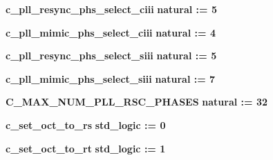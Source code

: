 \begin{DoxyCompactItemize}
\item 
{\bf c\+\_\+pll\+\_\+resync\+\_\+phs\+\_\+select\+\_\+ciii} {\bfseries \textcolor{comment}{natural}\textcolor{vhdlchar}{ }\textcolor{vhdlchar}{ }\textcolor{vhdlchar}{\+:}\textcolor{vhdlchar}{=}\textcolor{vhdlchar}{ }\textcolor{vhdlchar}{ } \textcolor{vhdldigit}{5} \textcolor{vhdlchar}{ }} 
\item 
{\bf c\+\_\+pll\+\_\+mimic\+\_\+phs\+\_\+select\+\_\+ciii} {\bfseries \textcolor{comment}{natural}\textcolor{vhdlchar}{ }\textcolor{vhdlchar}{ }\textcolor{vhdlchar}{\+:}\textcolor{vhdlchar}{=}\textcolor{vhdlchar}{ }\textcolor{vhdlchar}{ } \textcolor{vhdldigit}{4} \textcolor{vhdlchar}{ }} 
\item 
{\bf c\+\_\+pll\+\_\+resync\+\_\+phs\+\_\+select\+\_\+siii} {\bfseries \textcolor{comment}{natural}\textcolor{vhdlchar}{ }\textcolor{vhdlchar}{ }\textcolor{vhdlchar}{\+:}\textcolor{vhdlchar}{=}\textcolor{vhdlchar}{ }\textcolor{vhdlchar}{ } \textcolor{vhdldigit}{5} \textcolor{vhdlchar}{ }} 
\item 
{\bf c\+\_\+pll\+\_\+mimic\+\_\+phs\+\_\+select\+\_\+siii} {\bfseries \textcolor{comment}{natural}\textcolor{vhdlchar}{ }\textcolor{vhdlchar}{ }\textcolor{vhdlchar}{\+:}\textcolor{vhdlchar}{=}\textcolor{vhdlchar}{ }\textcolor{vhdlchar}{ } \textcolor{vhdldigit}{7} \textcolor{vhdlchar}{ }} 
\item 
{\bf C\+\_\+\+M\+A\+X\+\_\+\+N\+U\+M\+\_\+\+P\+L\+L\+\_\+\+R\+S\+C\+\_\+\+P\+H\+A\+S\+ES} {\bfseries \textcolor{comment}{natural}\textcolor{vhdlchar}{ }\textcolor{vhdlchar}{ }\textcolor{vhdlchar}{\+:}\textcolor{vhdlchar}{=}\textcolor{vhdlchar}{ }\textcolor{vhdlchar}{ } \textcolor{vhdldigit}{32} \textcolor{vhdlchar}{ }} 
\item 
{\bf c\+\_\+set\+\_\+oct\+\_\+to\+\_\+rs} {\bfseries \textcolor{comment}{std\+\_\+logic}\textcolor{vhdlchar}{ }\textcolor{vhdlchar}{ }\textcolor{vhdlchar}{\+:}\textcolor{vhdlchar}{=}\textcolor{vhdlchar}{ }\textcolor{vhdlchar}{ }\textcolor{vhdlchar}{\textquotesingle{}}\textcolor{vhdlchar}{ } \textcolor{vhdldigit}{0} \textcolor{vhdlchar}{ }\textcolor{vhdlchar}{\textquotesingle{}}\textcolor{vhdlchar}{ }} 
\item 
{\bf c\+\_\+set\+\_\+oct\+\_\+to\+\_\+rt} {\bfseries \textcolor{comment}{std\+\_\+logic}\textcolor{vhdlchar}{ }\textcolor{vhdlchar}{ }\textcolor{vhdlchar}{\+:}\textcolor{vhdlchar}{=}\textcolor{vhdlchar}{ }\textcolor{vhdlchar}{ }\textcolor{vhdlchar}{\textquotesingle{}}\textcolor{vhdlchar}{ } \textcolor{vhdldigit}{1} \textcolor{vhdlchar}{ }\textcolor{vhdlchar}{\textquotesingle{}}\textcolor{vhdlchar}{ }} 

\end{DoxyCompactItemize}
